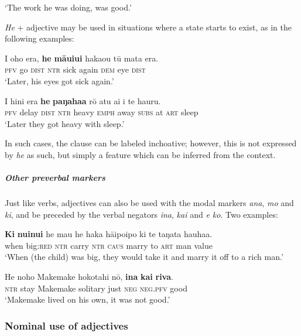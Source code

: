 \glt
‘The work he was doing, was good.’ \textstyleExampleref{[R313.116]} 
\z

\textit{He} + adjective may be used in situations where a state starts to exist, as in the following examples:

\ea\label{ex:3.103}
\gll I oho era, \textbf{he} \textbf{māuiui} haka{\ꞌ}ou tū mata era.\\
\textsc{pfv} go \textsc{dist} \textsc{ntr} sick again \textsc{dem} eye \textsc{dist}\\

\glt 
‘Later, his eyes got sick again.’ \textstyleExampleref{[R237.084]} 
\z

\ea\label{ex:3.104}
\gll I hini era \textbf{he} \textbf{paŋaha{\ꞌ}a} rō atu {\ꞌ}ai {\ꞌ}i te ha{\ꞌ}uru. \\
\textsc{pfv} delay \textsc{dist} \textsc{ntr} heavy \textsc{emph} away \textsc{subs} at \textsc{art} sleep \\

\glt
‘Later they got heavy with sleep.’ \textstyleExampleref{[R536.027]} 
\z

In such cases, the clause can be labeled inchoative; however, this is not expressed by \textit{he} as such, but simply a feature which can be inferred from the context.

\subparagraph{Other preverbal markers} Just like verbs, adjectives can also be used with the modal markers \textit{ana}, \textit{mo} and \textit{ki}, and be preceded by the verbal negators \textit{{\ꞌ}ina}, \textit{kai} and \textit{e ko}. Two examples:

\ea\label{ex:3.105}
\gll \textbf{Ki} \textbf{nuinui} he ma{\ꞌ}u he haka hāipoipo ki te taŋata hauha{\ꞌ}a.\\
when big:\textsc{red} \textsc{ntr} carry \textsc{ntr} \textsc{caus} marry to \textsc{art} man value\\

\glt 
‘When (the child) was big, they would take it and marry it off to a rich man.’ \textstyleExampleref{[R399.004]} 
\z

\ea\label{ex:3.106}
\gll He noho Makemake hokotahi nō, \textbf{{\ꞌ}ina} \textbf{kai} \textbf{riva}.\\
\textsc{ntr} stay Makemake solitary just \textsc{neg} \textsc{neg.pfv} good\\

\glt 
‘Makemake lived on his own, it was not good.’ \textstyleExampleref{[Ley-1-01.001]}
\z

\subsubsection[Nominal use of adjectives]{Nominal use of adjectives}\label{sec:3.5.1.6}

